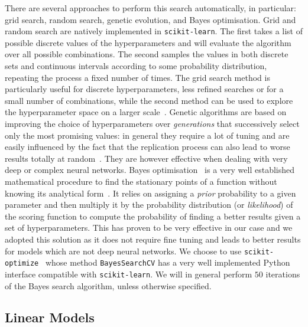 There are several approaches to perform this search automatically, in particular: grid search, random search, genetic evolution, and Bayes optimisation.
Grid and random search are natively implemented in \texttt{scikit-learn}.
The first takes a list of possible discrete values of the hyperparameters and will evaluate the algorithm over all possible combinations.
The second samples the values in both discrete sets and continuous intervals according to some probability distribution, repeating the process a fixed number of times.
The grid search method is particularly useful for discrete hyperparameters, less refined searches or for a small number of combinations, while the second method can be used to explore the hyperparameter space on a larger scale~\cite{Bergstra:2012:RandomSearchHyperparameter}.
Genetic algorithms are based on improving the choice of hyperparameters over \emph{generations} that successively select only the most promising values: in general they require a lot of tuning and are easily influenced by the fact that the replication process can also lead to worse results totally at random~\cite{Rudolph:1994:ConvergenceAnalysisCanonical}.
They are however effective when dealing with very deep or complex neural networks.
Bayes optimisation~\cite{Snoek:2012:PracticalBayesianOptimization, Shahriari:2015:TakingHumanOut} is a very well established mathematical procedure to find the stationary points of a function without knowing its analytical form~\cite{Mockus:1975:BayesianMethodsSeeking}.
It relies on assigning a \emph{prior} probability to a given parameter and then multiply it by the probability distribution (or \emph{likelihood}) of the scoring function to compute the probability of finding a better results given a set of hyperparameters.
This has proven to be very effective in our case and we adopted this solution as it does not require fine tuning and leads to better results for models which are not deep neural networks.
We choose to use \texttt{scikit-optimize}~\cite{Head:2020:ScikitoptimizeScikitoptimize} whose method \texttt{BayesSearchCV} has a very well implemented Python interface compatible with \texttt{scikit-learn}.
We will in general perform $50$ iterations of the Bayes search algorithm, unless otherwise specified.


\subsection{Linear Models}

